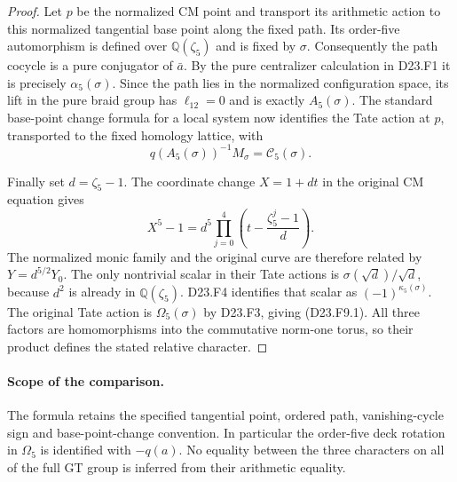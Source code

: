 \begin{proof}
Let $p$ be the normalized CM point and transport its arithmetic
action to this normalized tangential base point along the fixed
path.  Its order-five automorphism is defined over
$\mathbb Q(\zeta_5)$ and is fixed by $\sigma$.
Consequently the path cocycle is a pure conjugator of $\bar a$.
By the pure centralizer calculation in D23.F1 it is precisely
$\alpha_5(\sigma)$.  Since the path lies in the normalized
configuration space, its lift in the pure braid group has
$\ell_{12}=0$ and is exactly $A_5(\sigma)$.
The standard base-point change formula for a local system now
identifies the Tate action at $p$, transported to the fixed
homology lattice, with
\[
 q(A_5(\sigma))^{-1}M_\sigma
       =\mathcal C_5(\sigma).
\]

Finally set $d=\zeta_5-1$.  The coordinate change
$X=1+dt$ in the original CM equation gives
\[
 X^5-1=d^5\prod_{j=0}^4
             \left(t-\frac{\zeta_5^j-1}{d}\right).
\]
The normalized monic family and the original curve are
therefore related by $Y=d^{5/2}Y_0$.
The only nontrivial scalar in their Tate actions is
$\sigma(\sqrt d)/\sqrt d$, because $d^2$ is already in
$\mathbb Q(\zeta_5)$.  D23.F4 identifies that scalar as
$(-1)^{\kappa_5(\sigma)}$.  The original Tate action is
$\Omega_5(\sigma)$ by D23.F3, giving (D23.F9.1).
All three factors are homomorphisms into the commutative
norm-one torus, so their product defines the stated relative
character.
\end{proof}

\paragraph{Scope of the comparison.}
The formula retains the specified tangential point, ordered
path, vanishing-cycle sign and base-point-change convention.
In particular the order-five deck rotation in $\Omega_5$
is identified with $-q(a)$. No equality between the three
characters on all of the full GT group is inferred from
their arithmetic equality.
